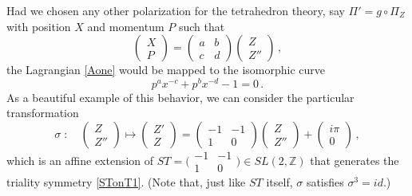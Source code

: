 \documentclass[hyper,letterpaper]{JHEP3}
\numberwithin{equation}{section}
\newcommand{\be}{\begin{equation}}
\newcommand{\ee}{\end{equation}}
\newcommand{\Z}{{\mathbb Z}}
\begin{document}
Had we chosen any other polarization for the tetrahedron theory, say $\Pi'=g\circ \Pi_Z$ with position $X$ and momentum $P$ such that
%
\be \begin{pmatrix} X\\P \end{pmatrix} = \begin{pmatrix}a & b\\ c & d\end{pmatrix} \begin{pmatrix}Z\\Z''\end{pmatrix}\,, \ee
%
the Lagrangian \eqref{Aone} would be mapped to the isomorphic curve
%
\be p^ax^{-c}+p^b x^{-d}-1 = 0\,.\ee
%
As a beautiful example of this behavior, we can consider the particular transformation
%
\be \sigma\;:\quad \begin{pmatrix}Z\\Z''\end{pmatrix}\mapsto
\begin{pmatrix}Z'\\Z\end{pmatrix}= \begin{pmatrix}-1 & -1\\ 1 & 0\end{pmatrix} \begin{pmatrix}Z\\Z''\end{pmatrix} + \begin{pmatrix} i\pi \\ 0 \end{pmatrix}\,, \label{sST} \ee
%
which is an affine extension of $ST = \big(\begin{smallmatrix} -1 & -1\\ 1 & 0\end{smallmatrix}\big)\in SL(2,\Z)$ that generates the triality symmetry \eqref{STonT1}. (Note that, just like $ST$ itself, $\sigma$ satisfies $\sigma^3 = id$.)
\end{document}
